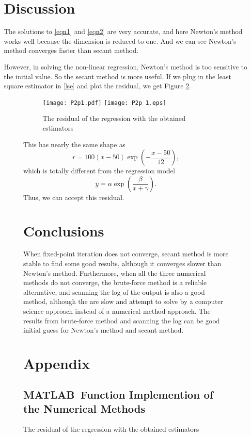\begin{table}[H]
\begin{table}[H]
\begin{table}[H]
\begin{table}[H]
\begin{table}[H]
\section{Discussion}
The solutions to \ref{eqn1} and \ref{eqn2} are very accurate, and here Newton's method works well because the dimension is reduced to one.
And we can see Newton's method converges faster than secant method.

However, in solving the non-linear regression, Newton's method is too sensitive to the initial value.
So the secant method is more useful.
If we plug in the least square estimator in \ref{lse} and plot the residual, we get Figure \ref{residual}.
\ifnum{}
	\begin{figure}[H]
\else
	\begin{figure}[htbp]
\fi
	\centering
	\ifpdf
		\texttt{[image: P2p1.pdf]}
	\else
		\texttt{[image: P2p	1.eps]}
	\fi
	\caption{The residual of the regression with the obtained estimators}
	\label{residual}
	\end{figure}

This has nearly the same shape as
\[	r=100(x-50)\exp\left(-\frac{x-50}{12} \right), \]
which is totally different from the regression model
\[	y=\alpha\exp\left(\frac{\beta}{x+\gamma}\right). \]
Thus, we can accept this residual.	


\section{Conclusions}

When fixed-point iteration does not converge, secant method is more stable to find some good results, although it converges slower than Newton's method.
Furthermore, when all the three numerical methods do not converge, the brute-force method is a reliable alternative, and scanning the log of the output is also a good method, although the are slow and attempt to solve by a computer science approach instead of a numerical method approach.
The results from brute-force method and scanning the log can be good initial guess for Newton's method and secant method.




\newpage
\begin{appendices}
\renewcommand{\thesection}{\Alph{section}}
\section{Appendix}
\subsection{MATLAB\texttrademark\ Function Implemention of the Numerical Methods}


\end{appendices}
\end{figure}
\end{table}
\end{table}
\end{table}
\end{table}
\end{table}
